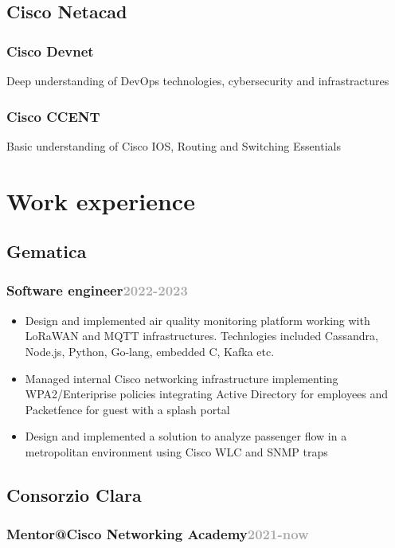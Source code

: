 \documentclass[11pt,a4paper]{article}
\begin{document}
  \subsection{Cisco Netacad}
  \subsubsection{Cisco Devnet} Deep understanding of DevOps technologies, cybersecurity and infrastractures
  \subsubsection{Cisco CCENT} Basic understanding of Cisco IOS, Routing and Switching Essentials

  \section*{Work experience}
  \subsection{Gematica}
  \subsubsection{Software engineer\hfill \textcolor{darkgray}{\small{2022-2023}}}
  \begin{itemize}
    \item Design and implemented air quality monitoring platform working with LoRaWAN and MQTT infrastructures. Technlogies included 
      Cassandra, Node.js, Python, Go-lang, embedded C, Kafka etc.
    \item Managed internal Cisco networking infrastructure implementing WPA2/Enteriprise policies integrating Active Directory for employees and Packetfence for guest with a splash portal
    \item Design and implemented a solution to analyze passenger flow in a metropolitan environment using Cisco WLC and SNMP traps
  \end{itemize}

  \subsection{Consorzio Clara}
  \subsubsection{Mentor@Cisco Networking Academy\hfill \textcolor{darkgray}{\small{2021-now}}}
\end{document}
